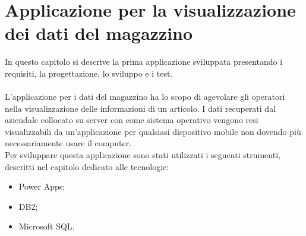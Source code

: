 \chapter{Applicazione per la visualizzazione dei dati del magazzino}\label{sec:1Applicazione}
In questo capitolo si descrive la prima applicazione sviluppata presentando i requisiti, la progettazione, lo sviluppo e i test.\\
\\L'applicazione per i dati del magazzino ha lo scopo di agevolare gli operatori nella visualizzazione delle informazioni di un articolo. I dati recuperati dal  aziendale collocato su server con  come sistema operativo vengono resi visualizzabili da un'applicazione per qualsiasi dispositivo mobile non dovendo più necessariamente usare il computer.\\
Per sviluppare questa applicazione sono stati utilizzati i seguenti strumenti, descritti nel capitolo dedicato alle tecnologie:
\begin{itemize}
    \item Power Apps;
    \item DB2;
    \item Microsoft SQL.
\end{itemize}

\newpage

